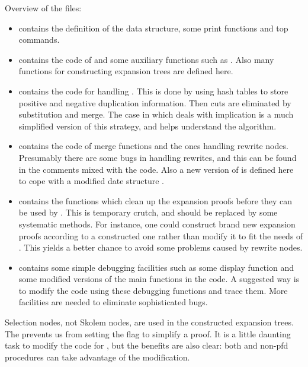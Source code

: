 Overview of the files:
\begin{itemize} 
\item {} contains the definition of the data structure,
some print functions and top commands.

\item {} contains the code of 
and some auxiliary functions such as . Also many
functions for constructing expansion trees are defined here.

\item {} contains the code for handling . This is done
by using hash tables to store positive and negative duplication
information. Then cuts are eliminated by substitution and merge.
The case in  which deals with implication
is a much simplified version of this strategy, and helps understand
the algorithm.

\item {} contains the code of merge functions and the ones handling
rewrite nodes. Presumably there are some bugs in handling rewrites, and
this can be found in the comments mixed with the code. Also a new version
of  is defined here to cope with a modified date structure
.

\item {} contains the functions which clean up the expansion
proofs before they can be used by . This is temporary crutch,
and should be replaced by some systematic methods. For instance, one
could construct brand new expansion proofs according to a constructed
one rather than modify it to fit the needs of . This yields
a better chance to avoid some problems caused by rewrite nodes. 

\item {} contains some simple debugging facilities such as some
display function and some modified versions of the main functions in the
code. A suggested way is to modify the code using these debugging functions
and trace them. More facilities are needed to eliminate sophisticated bugs.
\end{itemize}

Selection nodes, not Skolem nodes, are used in the constructed expansion
trees. The prevents us from setting the  flag to simplify a
proof. It is a little daunting task to modify the code for ,
but the benefits are also clear: both  and non-pfd procedures can
take advantage of the modification.

